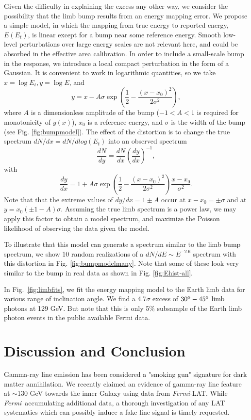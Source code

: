 \documentclass[aps,twocolumn,prd,superscriptaddress,showpacs,nofootinbib,fixfloat]{revtex4}
\newcommand{\be}{\begin{equation}}
\newcommand{\ee}{\end{equation}}
\newcommand{\Fermi}{{\slshape Fermi}}
\newcommand{\degree}{^{\rm o}}
\begin{document}
Given the difficulty in explaining the excess any other way,
we consider the possibility that the limb bump results from
an energy mapping error.  We propose a simple model, in
which the mapping from true energy to reported energy,
$E(E_t)$, is linear except for a bump near some reference
energy.  Smooth low-level perturbations over large energy
scales are not relevant here, and could be absorbed in the
effective area calibration.  In order to include a
small-scale bump in the response, we introduce a local
compact perturbation in the form of a Gaussian.  It is
convenient to work in logarithmic quantities, so we take
$x=\log E_t, y=\log E$, and \be
\label{eq:yofx}
y=x - A\sigma \exp\left(\frac{1}{2}-\frac{(x-x_0)^2}{2\sigma^2}\right),
\ee
where $A$ is a dimensionless amplitude of the bump ($-1<A<1$
is required for monotonicity of $y(x)$), $x_0$ is a
reference energy, and $\sigma$ is the width of the bump (see
Fig. \ref{fig:bumpmodel}).  The effect of the distortion is
to change the true spectrum $dN/dx = dN/dlog(E_t)$ into an
observed spectrum
\be
\label{eq:dndy}
\frac{dN}{dy} = \frac{dN}{dx} \left(\frac{dy}{dx}\right)^{-1} ,
\ee
with
\be
\label{eq:dydx}
\frac{dy}{dx} = 1 + A\sigma \exp\left(\frac{1}{2}-\frac{(x-x_0)^2}{2\sigma^2}\right)
\frac{x-x_0}{\sigma^2}.
\ee
Note that that the extreme values of $dy/dx = 1 \pm A$ occur
at $x-x_0 = \pm \sigma$ and at $y=x_0(\pm1-A)\sigma$.
Assuming the true limb spectrum is a power law, we may apply
this factor to obtain a model spectrum, and maximize the
Poisson likelihood of observing the data given the model.

To illustrate that this model can generate a spectrum
similar to the limb bump spectrum, we show 10 random
realizations of a $dN/dE \sim E^{-2.6}$ spectrum with this
distortion in Fig. \ref{fig:bumpmodelmany}.  Note that some of these
look very similar to the bump in real data as shown in Fig. \ref{fig:Ehist-all}. 

In Fig.~\ref{fig:limbfits}, we fit the energy mapping model
to the Earth limb data for various range of inclination
angle. We find a 4.7$\sigma$ excess of $30\degree-45\degree$
limb photons at 129 GeV. But note that this is only 5\% subsample of the Earth limb photon events in the public available Fermi data.


\section{Discussion and Conclusion}
\label{sec:Conclusion}

Gamma-ray line emission has been considered a "smoking gun"
signature for dark matter annihilation.  We recently claimed
an evidence of gamma-ray line feature at $\sim$130 GeV
towards the inner Galaxy using data from \Fermi-LAT. While
\Fermi\ accumulating additional data, a thorough
investigation of any LAT systematics which can possibly
induce a fake line signal is timely requested.
\end{document}
